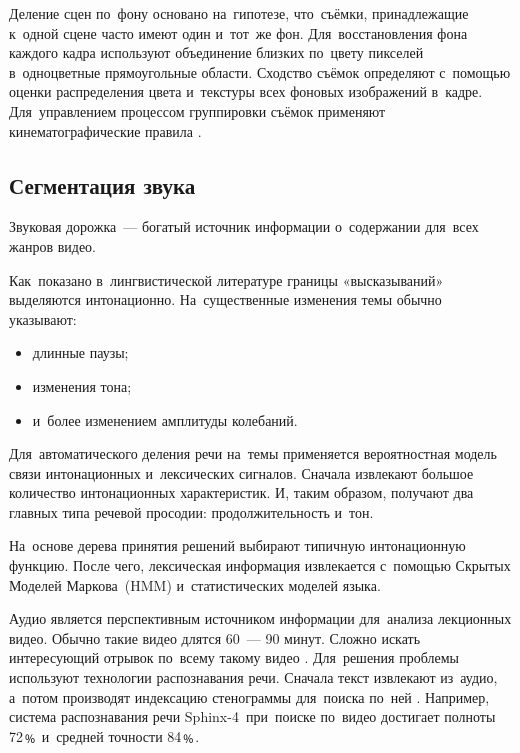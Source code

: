 Деление сцен по~фону основано на~гипотезе, что~съёмки,
принадлежащие к~одной сцене часто имеют один и~тот~же фон.
Для~восстановления фона каждого кадра используют объединение
близких по~цвету пикселей в~одноцветные прямоугольные области.
Сходство съёмок определяют с~помощью оценки распределения
цвета и~текстуры всех фоновых изображений в~кадре.
Для~управлением процессом группировки съёмок
применяют кинематографические правила \cite{Chen:2008}.

\subsection{Сегментация звука}

Звуковая дорожка~— богатый источник информации
о~содержании для~всех жанров видео.

Как~показано в~лингвистической литературе границы «высказываний»
выделяются интонационно.
На~существенные изменения темы обычно указывают:
\begin{itemize}
    \item длинные паузы;
    \item изменения тона;
    \item и~более изменением амплитуды колебаний.
\end{itemize}

Для~автоматического деления речи на~темы
применяется вероятностная модель связи интонационных
и~лексических сигналов.
Сначала извлекают большое количество интонационных характеристик.
И, таким образом, получают два главных типа речевой просодии:
продолжительность и~тон.

На~основе дерева принятия решений выбирают
типичную интонационную функцию.
После чего, лексическая информация извлекается
с~помощью Скрытых Моделей Маркова\
(HMM) и~статистических моделей языка.

Аудио является перспективным источником информации
для~анализа лекционных видео.
Обычно такие видео длятся 60~— 90 минут.
Сложно искать интересующий отрывок по~всему такому видео \cite{Repp:2008}.
Для~решения проблемы используют технологии
распознавания речи.
Сначала текст извлекают из~аудио,
а~потом производят индексацию стенограммы для~поиска по~ней \cite{Kumar:2011}.
Например, система распознавания речи Sphinx-4\index{Sphinx-4}\ при~поиске
по~видео достигает полноты 72﹪ и~средней точности 84﹪.

